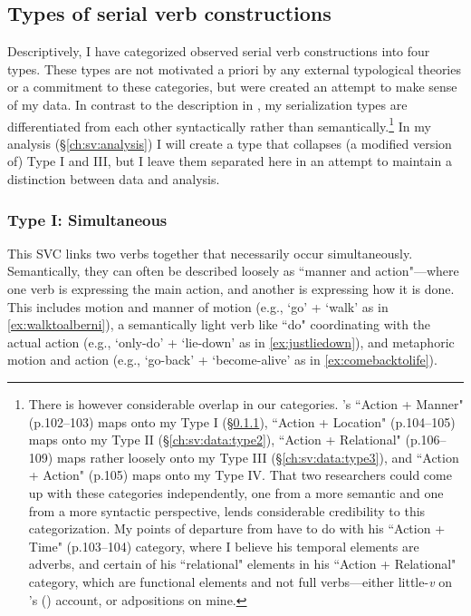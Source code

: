 \subsection{Types of serial verb constructions}

Descriptively, I have categorized observed serial verb constructions into four types. These types are not motivated a priori by any external typological theories or a commitment to these categories, but were created an attempt to make sense of my data. In contrast to the description in \citet[p.~102--109]{nakayama2001}, my serialization types are differentiated from each other syntactically rather than semantically.\footnote{There is however considerable overlap in our categories. \citeauthor{nakayama2001}'s ``Action + Manner" (p.102--103) maps onto my Type I (\S\ref{ch:sv:data:type1}), ``Action + Location" (p.104--105) maps onto my Type II (\S\ref{ch:sv:data:type2}), ``Action + Relational" (p.106--109) maps rather loosely onto my Type III (\S\ref{ch:sv:data:type3}), and ``Action + Action" (p.105) maps onto my Type IV. That two researchers could come up with these categories independently, one from a more semantic and one from a more syntactic perspective, lends considerable credibility to this categorization. My points of departure from \citeauthor{nakayama2001} have to do with his ``Action + Time" (p.103--104) category, where I believe his temporal elements are adverbs, and certain of his ``relational" elements in his ``Action + Relational" category, which are functional elements and not full verbs---either little-\textit{v} on \citeauthor{woo2007b}'s (\citeyear{woo2007b}) account, or adpositions on mine.} In my analysis (\S\ref{ch:sv:analysis}) I will create a type that collapses (a modified version of) Type I and III, but I leave them separated here in an attempt to maintain a distinction between data and analysis.

\vspace{10pt}

\subsubsection{Type I: Simultaneous} \label{ch:sv:data:type1}

\vspace{10pt}

This SVC links two verbs together that necessarily occur simultaneously. Semantically, they can often be described loosely as ``manner and action"---where one verb is expressing the main action, and another is expressing how it is done. This includes motion and manner of motion (e.g., `go' + `walk' as in \ref{ex:walktoalberni}), a semantically light verb like ``do" coordinating with the actual action (e.g., `only-do' + `lie-down' as in \ref{ex:justliedown}), and metaphoric motion and action (e.g., `go-back' + `become-alive' as in \ref{ex:comebacktolife}).

